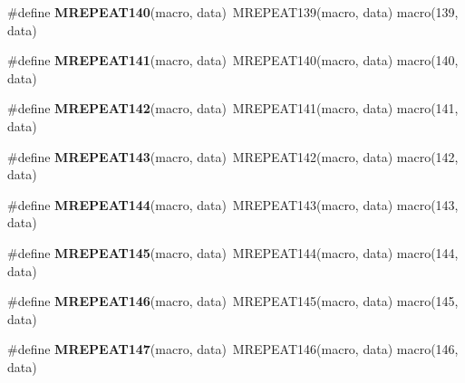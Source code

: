 \begin{DoxyCompactItemize}
\item 
\hypertarget{group__group__sam0__utils__mrepeat_ga040d95ace740614458cf565fe5cd29f4}{}\#define {\bfseries M\+R\+E\+P\+E\+A\+T140}(macro,  data)~M\+R\+E\+P\+E\+A\+T139(macro, data)   macro(139, data)\label{group__group__sam0__utils__mrepeat_ga040d95ace740614458cf565fe5cd29f4}

\item 
\hypertarget{group__group__sam0__utils__mrepeat_gad51aaacf4994383b35e14ed4b6d6c4b0}{}\#define {\bfseries M\+R\+E\+P\+E\+A\+T141}(macro,  data)~M\+R\+E\+P\+E\+A\+T140(macro, data)   macro(140, data)\label{group__group__sam0__utils__mrepeat_gad51aaacf4994383b35e14ed4b6d6c4b0}

\item 
\hypertarget{group__group__sam0__utils__mrepeat_ga6177414b6882cdd46b50b679a3cfb927}{}\#define {\bfseries M\+R\+E\+P\+E\+A\+T142}(macro,  data)~M\+R\+E\+P\+E\+A\+T141(macro, data)   macro(141, data)\label{group__group__sam0__utils__mrepeat_ga6177414b6882cdd46b50b679a3cfb927}

\item 
\hypertarget{group__group__sam0__utils__mrepeat_ga6f4bd791a6e9e20406ebf8a1ba70d3e7}{}\#define {\bfseries M\+R\+E\+P\+E\+A\+T143}(macro,  data)~M\+R\+E\+P\+E\+A\+T142(macro, data)   macro(142, data)\label{group__group__sam0__utils__mrepeat_ga6f4bd791a6e9e20406ebf8a1ba70d3e7}

\item 
\hypertarget{group__group__sam0__utils__mrepeat_ga02a2c148781cd12ab2a14368078ed3ed}{}\#define {\bfseries M\+R\+E\+P\+E\+A\+T144}(macro,  data)~M\+R\+E\+P\+E\+A\+T143(macro, data)   macro(143, data)\label{group__group__sam0__utils__mrepeat_ga02a2c148781cd12ab2a14368078ed3ed}

\item 
\hypertarget{group__group__sam0__utils__mrepeat_gaf589b0dcb9d280437d5f44216096cb09}{}\#define {\bfseries M\+R\+E\+P\+E\+A\+T145}(macro,  data)~M\+R\+E\+P\+E\+A\+T144(macro, data)   macro(144, data)\label{group__group__sam0__utils__mrepeat_gaf589b0dcb9d280437d5f44216096cb09}

\item 
\hypertarget{group__group__sam0__utils__mrepeat_gab1dc20a39d993d2afbf5e0cb8ebe91a0}{}\#define {\bfseries M\+R\+E\+P\+E\+A\+T146}(macro,  data)~M\+R\+E\+P\+E\+A\+T145(macro, data)   macro(145, data)\label{group__group__sam0__utils__mrepeat_gab1dc20a39d993d2afbf5e0cb8ebe91a0}

\item 
\hypertarget{group__group__sam0__utils__mrepeat_ga5fde582a7cf940039364190fade97523}{}\#define {\bfseries M\+R\+E\+P\+E\+A\+T147}(macro,  data)~M\+R\+E\+P\+E\+A\+T146(macro, data)   macro(146, data)\label{group__group__sam0__utils__mrepeat_ga5fde582a7cf940039364190fade97523}


\end{DoxyCompactItemize}
